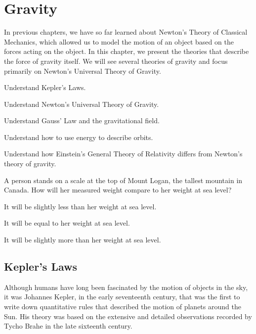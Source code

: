 
\chapter{Gravity}
\label{chapter:gravity}
In previous chapters, we have so far learned about Newton's Theory of Classical Mechanics, which allowed us to model the motion of an object based on the forces acting on the object. In this chapter, we present the theories that describe the force of gravity itself. We will see several theories of gravity and focus primarily on Newton's Universal Theory of Gravity. 

\begin{learningObjectives}{
 \item Understand Kepler's Laws.
 \item Understand Newton's Universal Theory of Gravity. 
 \item Understand Gauss' Law and the gravitational field.
 \item Understand how to use energy to describe orbits.
 \item Understand how Einstein's General Theory of Relativity differs from Newton's theory of gravity.
 }
\end{learningObjectives}

\begin{opening}
\begin{MCquestion}{A person stands on a scale at the top of Mount Logan, the tallest mountain in Canada. How will her measured weight compare to her weight at sea level?}
\item It will be slightly less than her weight at sea level. \correct
\item It will be equal to her weight at sea level.
\item It will be slightly more than her weight at sea level.
\end{MCquestion}
\end{opening}


\section{Kepler's Laws}
Although humans have long been fascinated by the motion of objects in the sky, it was Johannes Kepler, in the early seventeenth century, that was the first to write down quantitative rules that described the motion of planets around the Sun. His theory was based on the extensive and detailed observations recorded by Tycho Brahe in the late sixteenth century. 

